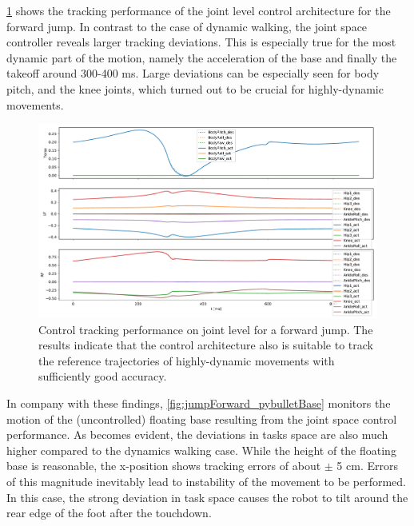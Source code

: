 \ref{fig:jumpForward_pybulletTracking} shows the tracking performance of the joint level control architecture for the forward jump. In contrast to the case of dynamic walking, the joint space controller reveals larger tracking deviations. This is especially true for the most dynamic part of the motion, namely the acceleration of the base and finally the takeoff around 300-400 ms. Large deviations can be especially seen for body pitch, and the knee joints, which turned out to be crucial for highly-dynamic movements. 

\begin{figure}[h!]
\centering	
\includegraphics[width=1\textwidth]{fig/jumpForward/pybullet/pybulletTracking}
\caption[Control tracking performance on joint level for a forward jump]{Control tracking performance on joint level for a forward jump. The results indicate that the control architecture also is suitable to track the reference trajectories of highly-dynamic movements with sufficiently good accuracy.}
\label{fig:jumpForward_pybulletTracking}
\end{figure}

In company with these findings, \cref{fig:jumpForward_pybulletBase} monitors the motion of the (uncontrolled) floating base resulting from the joint space control performance. As becomes evident, the deviations in tasks space are also much higher compared to the dynamics walking case. While the height of the floating base is reasonable, the x-position shows tracking errors of about $\pm$ 5 cm. Errors of this magnitude inevitably lead to instability of the movement to be performed. In this case, the strong deviation in task space causes the robot to tilt around the rear edge of the foot after the touchdown. 

